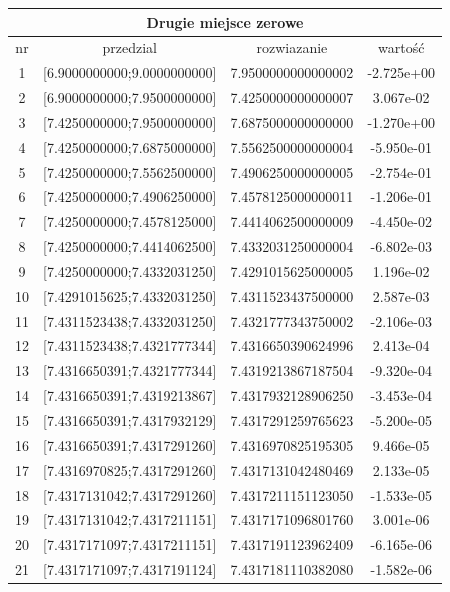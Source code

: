 \documentclass[11pt, oneside]{article}   	%
\begin{document}
\begin{center}
\begin{tabular}{ |c|c|c|c| } 
\hline
\multicolumn{4}{|c|}{Drugie miejsce zerowe} \\
 \hline
 nr & przedzial & rozwiazanie & wartość \\
 \hline
 1 & [6.9000000000;9.0000000000] & 7.9500000000000002 &   -2.725e+00 \\ 
  2 & [6.9000000000;7.9500000000] & 7.4250000000000007 &    3.067e-02 \\ 
  3 & [7.4250000000;7.9500000000] & 7.6875000000000000 &   -1.270e+00 \\ 
  4 & [7.4250000000;7.6875000000] & 7.5562500000000004 &   -5.950e-01 \\ 
  5 & [7.4250000000;7.5562500000] & 7.4906250000000005 &   -2.754e-01 \\ 
  6 & [7.4250000000;7.4906250000] & 7.4578125000000011 &   -1.206e-01 \\ 
  7 & [7.4250000000;7.4578125000] & 7.4414062500000009 &   -4.450e-02 \\ 
  8 & [7.4250000000;7.4414062500] & 7.4332031250000004 &   -6.802e-03 \\ 
  9 & [7.4250000000;7.4332031250] & 7.4291015625000005 &    1.196e-02 \\ 
 10 & [7.4291015625;7.4332031250] & 7.4311523437500000 &    2.587e-03 \\ 
 11 & [7.4311523438;7.4332031250] & 7.4321777343750002 &   -2.106e-03 \\ 
 12 & [7.4311523438;7.4321777344] & 7.4316650390624996 &    2.413e-04 \\ 
 13 & [7.4316650391;7.4321777344] & 7.4319213867187504 &   -9.320e-04 \\ 
 14 & [7.4316650391;7.4319213867] & 7.4317932128906250 &   -3.453e-04 \\ 
 15 & [7.4316650391;7.4317932129] & 7.4317291259765623 &   -5.200e-05 \\ 
 16 & [7.4316650391;7.4317291260] & 7.4316970825195305 &    9.466e-05 \\ 
 17 & [7.4316970825;7.4317291260] & 7.4317131042480469 &    2.133e-05 \\ 
 18 & [7.4317131042;7.4317291260] & 7.4317211151123050 &   -1.533e-05 \\ 
 19 & [7.4317131042;7.4317211151] & 7.4317171096801760 &    3.001e-06 \\ 
 20 & [7.4317171097;7.4317211151] & 7.4317191123962409 &   -6.165e-06 \\ 
 21 & [7.4317171097;7.4317191124] & 7.4317181110382080 &   -1.582e-06 \\ 

\end{tabular}
\end{center}
\end{document}
